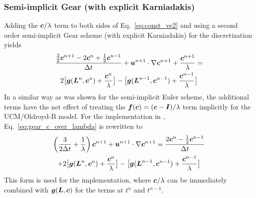 \subsubsection{Semi-implicit Gear (with explicit Karniadakis)}
Adding the $\boldsymbol{c}/\lambda$ term to both sides of Eq.~\eqref{eq:const_ve2} 
and using a second order semi-implicit Gear scheme (with explicit Karniadakis)
for the discretization yields
\begin{multline}
  \frac{\frac32 \boldsymbol{c}^{n+1}-2\boldsymbol{c}^n+\frac12 \boldsymbol{c}^{n-1}}{\Delta t}+
  \boldsymbol{u}^{n+1}\cdot\nabla\boldsymbol{c}^{n+1}+\frac{\boldsymbol{c}^{n+1}}{\lambda}=\\
2\big[\boldsymbol{g}(\boldsymbol{L}^n,{\boldsymbol{c}}^{n})+\frac{{\boldsymbol{c}}^{n}}{\lambda}\big]
-\big[\boldsymbol{g}(\boldsymbol{L}^{n-1},{\boldsymbol{c}}^{n-1})+
  \frac{\boldsymbol{c}^{n-1}}{\lambda}\big]
  \label{eq:geark_c_over_lambda}
\end{multline}
In a similar way as was shown for the semi-implicit 
Euler scheme, the additional terms have the net effect of treating the
$\boldsymbol{f}(\boldsymbol{c})=(\boldsymbol{c} - \boldsymbol{I})/\lambda$ term implicitly for the
UCM/Oldroyd-B model.
For the implementation in 
\tfem, Eq.~\eqref{eq:gear_c_over_lambda} is rewritten to
\begin{multline}
 \left(\frac{3}{2\Delta t}+\frac{1}{\lambda}\right)\boldsymbol{c}^{n+1} +
   {\boldsymbol{u}}^{n+1}\cdot\nabla\boldsymbol{c}^{n+1}=
  \frac{2\boldsymbol{c}^{n}-\frac12\boldsymbol{c}^{n-1}}{\Delta t} \\+
2\big[\boldsymbol{g}(\boldsymbol{L}^n,{\boldsymbol{c}}^{n})+\frac{{\boldsymbol{c}}^{n}}{\lambda}\big]
-\big[\boldsymbol{g}(\boldsymbol{L}^{n-1},{\boldsymbol{c}}^{n-1})+
  \frac{\boldsymbol{c}^{n-1}}{\lambda}\big]
  \label{eq:geark_implementation}
\end{multline}
This form is used for the implementation, where $\boldsymbol{c}/\lambda$
can be immediately combined with $\boldsymbol{g}(\boldsymbol{L},\boldsymbol{c})$ for the terms at $t^n$ and $t^{n-1}$.

